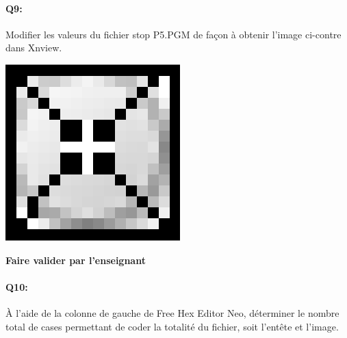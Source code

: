 \documentclass{article}
\begin{document}
\begin{minipage}[b]{.8\linewidth}
	\paragraph{Q9:}
	Modifier les valeurs du fichier \og{}stop P5.PGM\fg{} de façon à obtenir l'image ci-contre dans \og{}Xnview\fg{}.
	\vspace{2em}
\end{minipage}
\hfill
\begin{minipage}[b]{.12\linewidth}
	\includegraphics[width=\linewidth]{./figures/stop_modif.png}
\end{minipage}

\begin{center}
	\Large
	\textbf{Faire valider par l'enseignant}
\end{center}

\paragraph{Q10:}
À l'aide de la colonne de gauche de \og{}Free Hex Editor Neo\fg{}, déterminer le nombre total de cases permettant de coder la totalité du fichier, 
soit l'entête et l'image.

\vspace{1em}
\begin{Form}
	\TextField[name=r10,width=\linewidth,height=5em,multiline=true]{}
\end{Form}
\end{document}
